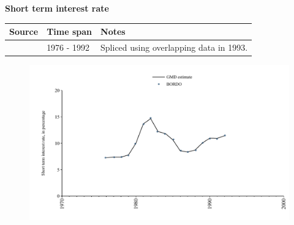\documentclass[12pt,a4paper,landscape]{article}
\begin{document}
\begin{adjustbox}{max totalsize={\paperwidth}{\paperheight},center}
\begin{minipage}[t][\textheight][t]{\textwidth}
\vspace*{0.5cm}
{}
\begin{center}
{\Large\bfseries Short term interest rate}
\end{center}
\vspace{0.5cm}
\begin{table}[H]
\centering
\small
\begin{tabular}{|l|l|l|}
\hline
\textbf{Source} & \textbf{Time span} & \textbf{Notes} \\
\hline
\rowcolor{white}\cite{BORDO}& 1976 - 1992 &Spliced using overlapping data in 1993. \\
\hline
\end{tabular}
\end{table}
\begin{figure}[H]
\centering
\includegraphics[width=\textwidth,height=0.6\textheight,keepaspectratio]{graphs/SEN_strate.pdf}
\end{figure}
\end{minipage}
\end{adjustbox}
\end{document}
